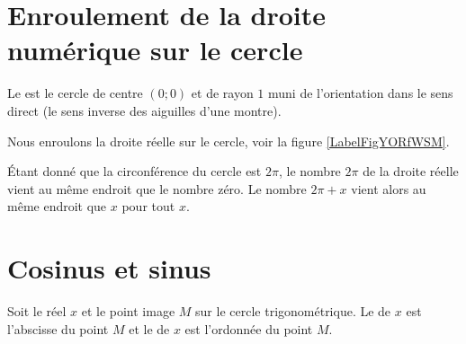 
\section{Enroulement de la droite numérique sur le cercle}

\begin{definition}
    Le  est le cercle de centre \( (0;0)\) et de rayon \( 1\) muni de l'orientation dans le sens direct (le sens inverse des aiguilles d'une montre).
\end{definition}

Nous enroulons la droite réelle sur le cercle, voir la figure \ref{LabelFigYORfWSM}. %
\newcommand{\CaptionFigYORfWSM}{Un cercle trigonométrique avec enroulement de la droite rélle.}


Étant donné que la circonférence du cercle est \( 2\pi\), le nombre \( 2\pi\) de la droite réelle vient au même endroit que le nombre zéro. Le nombre \( 2\pi+x\) vient alors au même endroit que \( x\) pour tout \( x\).

\section{Cosinus et sinus}

\begin{minipage}{0.485\textwidth}
\begin{definition}
    Soit le réel \( x\) et le point image \( M\) sur le cercle trigonométrique. Le  de \( x\) est l'abscisse du point \( M\) et le  de \(x\) est l'ordonnée du point \( M\).
\end{definition}
\end{minipage}
\hspace{1mm}
\begin{minipage}{6cm}
    \begin{center}
   
    \end{center}
\end{minipage}

